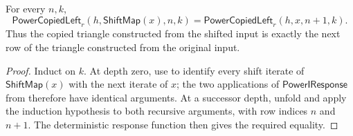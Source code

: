 \begin{lemma}
For every $n,k$,
\[
\mathsf{PowerCopiedLeft}_r(h,\mathsf{ShiftMap}(x),n,k)
=\mathsf{PowerCopiedLeft}_r(h,x,n+1,k).
\]
Thus the copied triangle constructed from the shifted input is exactly the
next row of the triangle constructed from the original input.
\end{lemma}
\begin{proof}
Induct on $k$.  At depth zero, use
 to identify every shift iterate of
$\mathsf{ShiftMap}(x)$ with the next iterate of $x$; the two applications of
$\mathsf{PowerIResponse}$ from  therefore have identical arguments.  At a
successor depth, unfold  and apply the induction
hypothesis to both recursive arguments, with row indices $n$ and $n+1$.
The deterministic response function then gives the required equality.
\end{proof}
